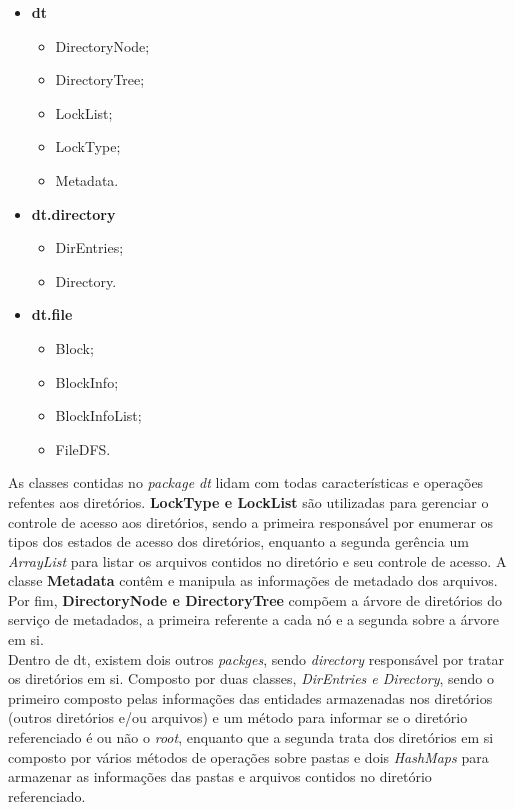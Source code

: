 \begin{itemize}
	\item \textbf{dt}
	\begin{itemize}
		\item DirectoryNode;
		\item DirectoryTree;
		\item LockList;
		\item LockType;
		\item Metadata.
	\end{itemize}
	\item \textbf{dt.directory}
	\begin{itemize}
		\item DirEntries;
		\item Directory.
	\end{itemize}
	\item \textbf{dt.file}
	\begin{itemize}
		\item Block;
		\item BlockInfo;
		\item BlockInfoList;
		\item FileDFS.
	\end{itemize}
\end{itemize}

As classes contidas no \textit{package dt} lidam com todas características e operações refentes aos diretórios. \textbf{LockType e LockList} são utilizadas para gerenciar o controle de acesso aos diretórios, sendo a primeira responsável por enumerar os tipos dos estados de acesso dos diretórios, enquanto a segunda gerência um \textit{ArrayList} para listar os arquivos contidos no diretório e seu controle de acesso. A classe \textbf{Metadata} contêm e manipula as informações de metadado dos arquivos. Por fim, \textbf{DirectoryNode e DirectoryTree} compõem a árvore de diretórios do serviço de metadados, a primeira referente a cada nó e a segunda sobre a árvore em si.
\\

Dentro de dt, existem dois outros \textit{packges}, sendo \textit{directory} responsável por tratar os diretórios em si. Composto por duas classes, \textit{DirEntries e Directory}, sendo o primeiro composto pelas informações das entidades armazenadas nos diretórios (outros diretórios e/ou arquivos) e um método para informar se o diretório referenciado é ou não o \textit{root}, enquanto que a segunda trata dos diretórios em si composto por vários métodos de operações sobre pastas e dois \textit{HashMaps} para armazenar as informações das pastas e arquivos contidos no diretório referenciado.
\\

